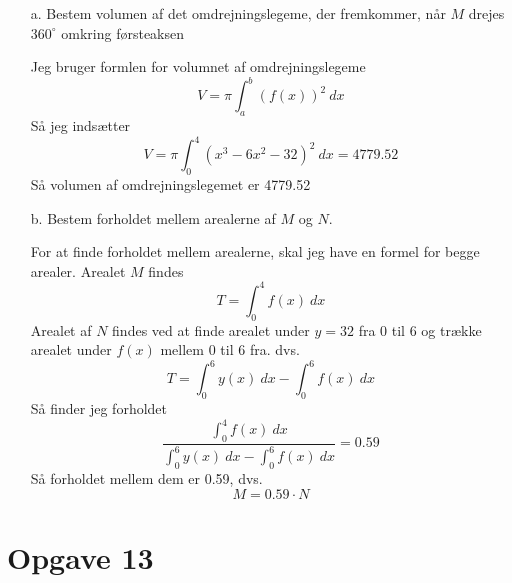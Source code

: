\documentclass[12pt]{article}
\begin{document}
\begin{enumerate}

        \item[a.] Bestem volumen af det omdrejningslegeme, der fremkommer,
                når $M$ drejes $360^{\circ}$ omkring førsteaksen

                Jeg bruger formlen for volumnet af omdrejningslegeme
                $$V = \pi \int_a^b (f(x))^2\ dx$$
                Så jeg indsætter
                $$V = \pi \int_0^4 (x^3-6x^2-32)^2\ dx = 4779.52$$
                Så volumen af omdrejningslegemet er 4779.52

        \item[b.] Bestem forholdet mellem arealerne af $M$ og $N$.

                For at finde forholdet mellem arealerne, skal jeg have en formel for
                begge arealer. Arealet $M$ findes
                $$T = \int_0^4 f(x)\ dx$$
                Arealet af $N$ findes ved at finde arealet under $y = 32$ fra 0 til 6
                og trække arealet under $f(x)$ mellem 0 til 6 fra. dvs.
                $$T = \int_0^6 y(x)\ dx - \int_0^6 f(x)\ dx$$
                Så finder jeg forholdet
                $$\frac{\int_0^4 f(x)\ dx}{\int_0^6 y(x)\ dx - \int_0^6 f(x)\ dx} = 0.59$$
                Så forholdet mellem dem er 0.59, dvs.
                $$M = 0.59\cdot N$$

\end{enumerate}

\section*{Opgave 13}
\end{document}

